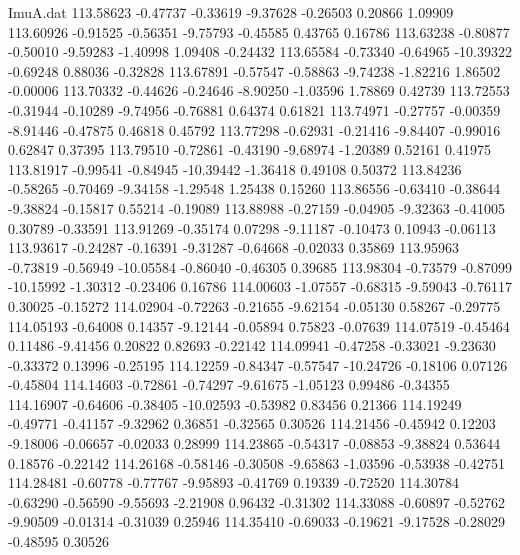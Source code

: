 \begin{filecontents}{ImuA.dat}
 113.58623   -0.47737   -0.33619   -9.37628   -0.26503    0.20866    1.09909
 113.60926   -0.91525   -0.56351   -9.75793   -0.45585    0.43765    0.16786
 113.63238   -0.80877   -0.50010   -9.59283   -1.40998    1.09408   -0.24432
 113.65584   -0.73340   -0.64965  -10.39322   -0.69248    0.88036   -0.32828
 113.67891   -0.57547   -0.58863   -9.74238   -1.82216    1.86502   -0.00006
 113.70332   -0.44626   -0.24646   -8.90250   -1.03596    1.78869    0.42739
 113.72553   -0.31944   -0.10289   -9.74956   -0.76881    0.64374    0.61821
 113.74971   -0.27757   -0.00359   -8.91446   -0.47875    0.46818    0.45792
 113.77298   -0.62931   -0.21416   -9.84407   -0.99016    0.62847    0.37395
 113.79510   -0.72861   -0.43190   -9.68974   -1.20389    0.52161    0.41975
 113.81917   -0.99541   -0.84945  -10.39442   -1.36418    0.49108    0.50372
 113.84236   -0.58265   -0.70469   -9.34158   -1.29548    1.25438    0.15260
 113.86556   -0.63410   -0.38644   -9.38824   -0.15817    0.55214   -0.19089
 113.88988   -0.27159   -0.04905   -9.32363   -0.41005    0.30789   -0.33591
 113.91269   -0.35174    0.07298   -9.11187   -0.10473    0.10943   -0.06113
 113.93617   -0.24287   -0.16391   -9.31287   -0.64668   -0.02033    0.35869
 113.95963   -0.73819   -0.56949  -10.05584   -0.86040   -0.46305    0.39685
 113.98304   -0.73579   -0.87099  -10.15992   -1.30312   -0.23406    0.16786
 114.00603   -1.07557   -0.68315   -9.59043   -0.76117    0.30025   -0.15272
 114.02904   -0.72263   -0.21655   -9.62154   -0.05130    0.58267   -0.29775
 114.05193   -0.64008    0.14357   -9.12144   -0.05894    0.75823   -0.07639
 114.07519   -0.45464    0.11486   -9.41456    0.20822    0.82693   -0.22142
 114.09941   -0.47258   -0.33021   -9.23630   -0.33372    0.13996   -0.25195
 114.12259   -0.84347   -0.57547  -10.24726   -0.18106    0.07126   -0.45804
 114.14603   -0.72861   -0.74297   -9.61675   -1.05123    0.99486   -0.34355
 114.16907   -0.64606   -0.38405  -10.02593   -0.53982    0.83456    0.21366
 114.19249   -0.49771   -0.41157   -9.32962    0.36851   -0.32565    0.30526
 114.21456   -0.45942    0.12203   -9.18006   -0.06657   -0.02033    0.28999
 114.23865   -0.54317   -0.08853   -9.38824    0.53644    0.18576   -0.22142
 114.26168   -0.58146   -0.30508   -9.65863   -1.03596   -0.53938   -0.42751
 114.28481   -0.60778   -0.77767   -9.95893   -0.41769    0.19339   -0.72520
 114.30784   -0.63290   -0.56590   -9.55693   -2.21908    0.96432   -0.31302
 114.33088   -0.60897   -0.52762   -9.90509   -0.01314   -0.31039    0.25946
 114.35410   -0.69033   -0.19621   -9.17528   -0.28029   -0.48595    0.30526

\end{filecontents}
